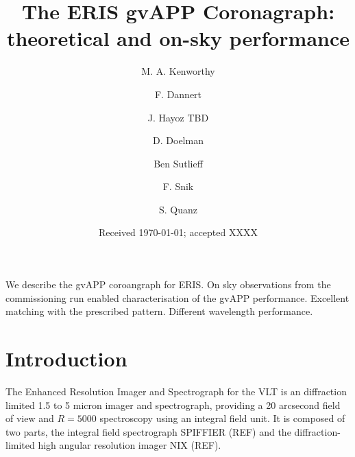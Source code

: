 \documentclass{aa}
\begin{document}
 
  \title{The ERIS gvAPP Coronagraph: theoretical and on-sky performance}

   \author{M. A. Kenworthy
          \and
          F. Dannert
          \and
          J. Hayoz
          TBD
          \and
          D. Doelman
          \and
          Ben Sutlieff
          \and
          F. Snik
        \and
        S. Quanz
          }

   \date{Received \today; accepted XXXX}

 
  \abstract
   {}
   {We describe the gvAPP coroangraph for ERIS.}
   {On sky observations from the commissioning run enabled characterisation of the gvAPP performance.}
   {Excellent matching with the prescribed pattern.
   Different wavelength performance.}
   {}


   \maketitle
%

   \section{Introduction}

The Enhanced Resolution Imager and Spectrograph for the VLT \citep[ERIS; ][]{2023A&A...674A.207D} is an diffraction limited 1.5 to 5 micron imager and spectrograph, providing a 20 arcsecond field of view and $R=5000$ spectroscopy using an integral field unit.
%
It is composed of two parts, the integral field spectrograph SPIFFIER (REF) and the diffraction-limited high angular resolution imager NIX (REF).
\end{document}
